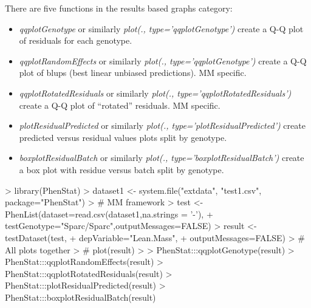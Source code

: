 \documentclass[a4paper]{article}
\begin{document}
There are five functions in the results based graphs category:
\begin{itemize}
\item \textit{qqplotGenotype} or similarly  \textit{plot(., type='qqplotGenotype')} create a Q-Q plot of residuals for each genotype.
\item \textit{qqplotRandomEffects} or similarly  \textit{plot(., type='qqplotGenotype')} create a Q-Q plot of blups (best linear unbiased predictions). MM specific.
\item \textit{qqplotRotatedResiduals} or similarly  \textit{plot(., type='qqplotRotatedResiduals')} create a Q-Q plot of ``rotated'' residuals. MM specific.
\item \textit{plotResidualPredicted} or similarly  \textit{plot(., type='plotResidualPredicted')} create predicted versus residual values plots split by genotype.
\item \textit{boxplotResidualBatch} or similarly  \textit{plot(., type='boxplotResidualBatch')} create a box plot with residue versus batch split by genotype.
\end{itemize}

\begin{Schunk}
\begin{Sinput}
> library(PhenStat)
> dataset1 <- system.file("extdata", "test1.csv", package="PhenStat")
> # MM framework
> test <- PhenList(dataset=read.csv(dataset1,na.strings = '-'),
+                  testGenotype="Sparc/Sparc",outputMessages=FALSE)
> result <- testDataset(test,
+                       depVariable="Lean.Mass",
+                       outputMessages=FALSE)
> # All plots together
> # plot(result)
> 
> PhenStat:::qqplotGenotype(result)
> PhenStat:::qqplotRandomEffects(result)
> PhenStat:::qqplotRotatedResiduals(result)
> PhenStat:::plotResidualPredicted(result)
> PhenStat:::boxplotResidualBatch(result)
\end{Sinput}
\end{Schunk}
\end{document}
